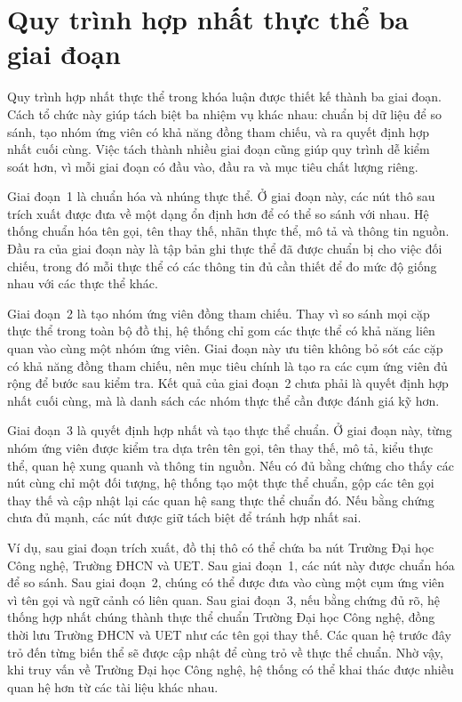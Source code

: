\section{Quy trình hợp nhất thực thể ba giai đoạn}

Quy trình hợp nhất thực thể trong khóa luận được thiết kế thành ba giai đoạn. Cách tổ chức này giúp tách biệt ba nhiệm vụ khác nhau: chuẩn bị dữ liệu để so sánh, tạo nhóm ứng viên có khả năng đồng tham chiếu, và ra quyết định hợp nhất cuối cùng. Việc tách thành nhiều giai đoạn cũng giúp quy trình dễ kiểm soát hơn, vì mỗi giai đoạn có đầu vào, đầu ra và mục tiêu chất lượng riêng.

Giai đoạn~1 là chuẩn hóa và nhúng thực thể. Ở giai đoạn này, các nút thô sau trích xuất được đưa về một dạng ổn định hơn để có thể so sánh với nhau. Hệ thống chuẩn hóa tên gọi, tên thay thế, nhãn thực thể, mô tả và thông tin nguồn. Đầu ra của giai đoạn này là tập bản ghi thực thể đã được chuẩn bị cho việc đối chiếu, trong đó mỗi thực thể có các thông tin đủ cần thiết để đo mức độ giống nhau với các thực thể khác.

Giai đoạn~2 là tạo nhóm ứng viên đồng tham chiếu. Thay vì so sánh mọi cặp thực thể trong toàn bộ đồ thị, hệ thống chỉ gom các thực thể có khả năng liên quan vào cùng một nhóm ứng viên. Giai đoạn này ưu tiên không bỏ sót các cặp có khả năng đồng tham chiếu, nên mục tiêu chính là tạo ra các cụm ứng viên đủ rộng để bước sau kiểm tra. Kết quả của giai đoạn~2 chưa phải là quyết định hợp nhất cuối cùng, mà là danh sách các nhóm thực thể cần được đánh giá kỹ hơn.

Giai đoạn~3 là quyết định hợp nhất và tạo thực thể chuẩn. Ở giai đoạn này, từng nhóm ứng viên được kiểm tra dựa trên tên gọi, tên thay thế, mô tả, kiểu thực thể, quan hệ xung quanh và thông tin nguồn. Nếu có đủ bằng chứng cho thấy các nút cùng chỉ một đối tượng, hệ thống tạo một thực thể chuẩn, gộp các tên gọi thay thế và cập nhật lại các quan hệ sang thực thể chuẩn đó. Nếu bằng chứng chưa đủ mạnh, các nút được giữ tách biệt để tránh hợp nhất sai.

Ví dụ, sau giai đoạn trích xuất, đồ thị thô có thể chứa ba nút Trường Đại học Công nghệ, Trường ĐHCN và UET. Sau giai đoạn~1, các nút này được chuẩn hóa để so sánh. Sau giai đoạn~2, chúng có thể được đưa vào cùng một cụm ứng viên vì tên gọi và ngữ cảnh có liên quan. Sau giai đoạn~3, nếu bằng chứng đủ rõ, hệ thống hợp nhất chúng thành thực thể chuẩn Trường Đại học Công nghệ, đồng thời lưu Trường ĐHCN và UET như các tên gọi thay thế. Các quan hệ trước đây trỏ đến từng biến thể sẽ được cập nhật để cùng trỏ về thực thể chuẩn. Nhờ vậy, khi truy vấn về Trường Đại học Công nghệ, hệ thống có thể khai thác được nhiều quan hệ hơn từ các tài liệu khác nhau.


